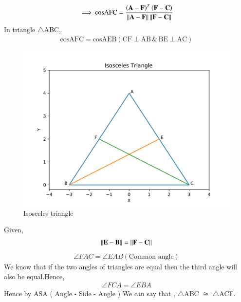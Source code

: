 \documentclass[journal,12pt,twocolumn]{IEEEtran}
\begin{document}
\begin{align}
\implies \text{cosAFC} = \frac{\left( \mathbf{A-F} \right)^T  \left( \mathbf{F - C } \right)}{\left\lVert\mathbf{A - F}\right\rVert \left\lVert\mathbf{F - C}\right\rVert}
\end{align}
 In triangle $\triangle$ABC, 
 \begin{align}
 \text{cosAFC} = \text{cosAEB} \left( \text{CF} \perp \text{AB} \hspace{2pt} \& \hspace{2pt} \text{BE} \perp \text{AC}\right)    
 \end{align}
 \begin{figure}[htb!]	
 	\centering	
 	\includegraphics[width=.50\textwidth, height=.30\textheight]{Figure_1.pdf}	
 	\caption{Isosceles triangle}
 	\label{fig1}	
 \end{figure}

Given,  
\begin{align}
\left\lVert\mathbf{E - B}\right\rVert = \left\lVert\mathbf{F - C}\right\rVert \label{eq7}
\end{align}
\begin{align}
\angle FAC = \angle EAB \left( \text{Common angle}\right) \label{eq1.8}
\end{align}
 We know that if the two angles of triangles are equal then the third angle will also be equal.Hence,
 \begin{align}
 \angle FCA = \angle EBA  \label{eq1.9}
 \end{align}
   Hence by ASA (  Angle - Side - Angle ) We can say that , $\triangle$ABC $\cong$ $\triangle$ACF.
\end{document}
